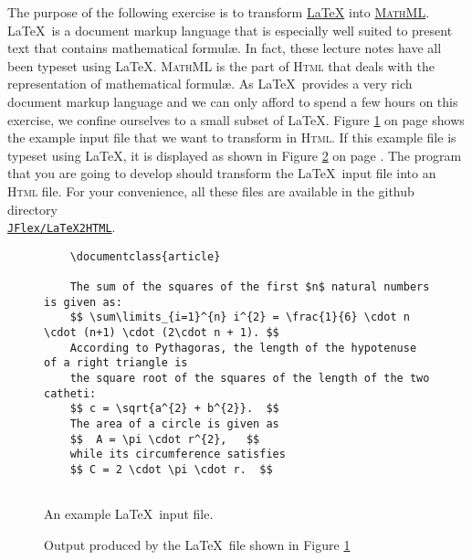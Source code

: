 \exerciseEng
The purpose of the following exercise is to transform \href{http://www.latex-project.org}{\LaTeX} into 
\href{https://www.tutorialspoint.com/mathml/index.htm}{\textsc{MathML}}.  \LaTeX\ is a document markup language
that is especially well suited to present text that contains mathematical formul\ae.  In fact, these
lecture notes have all been typeset using \LaTeX.  \textsc{MathML} is the part of \textsc{Html} that
deals with the representation of mathematical formul\ae.  As \LaTeX\ provides a very rich
document markup language and we can only afford to spend a few hours on this exercise, we confine
ourselves to a small subset of \LaTeX.  Figure \ref{fig:input.tex} on page \pageref{fig:input.tex}
shows the example input file that we want to transform in \textsc{Html}.  If this example file is
typeset using \LaTeX, it is displayed as shown in Figure \ref{fig:input.pdf} on page
\pageref{fig:input.pdf}.  The program that you are
going to develop should transform the \LaTeX\ input file into an \textsc{Html} file.  For your
convenience, all these files are available in the github directory 
\\[0.2cm]
\hspace*{1.3cm}
\href{https://github.com/karlstroetmann/Formal-Languages/tree/master/JFlex/LaTeX2HTML}{\texttt{JFlex/LaTeX2HTML}}.

\begin{figure}[!ht]
  \centering
\begin{verbatim}
    \documentclass{article}
    
    The sum of the squares of the first $n$ natural numbers is given as:
    $$ \sum\limits_{i=1}^{n} i^{2} = \frac{1}{6} \cdot n \cdot (n+1) \cdot (2\cdot n + 1). $$
    According to Pythagoras, the length of the hypotenuse of a right triangle is
    the square root of the squares of the length of the two catheti:
    $$ c = \sqrt{a^{2} + b^{2}}.  $$
    The area of a circle is given as 
    $$  A = \pi \cdot r^{2},   $$ 
    while its circumference satisfies
    $$ C = 2 \cdot \pi \cdot r.  $$
    
    \end{verbatim}
  \caption{An example \LaTeX\ input file.}
  \label{fig:input.tex}
\end{figure}

\begin{figure}[!ht]
  \centering
  \caption{Output produced by the \LaTeX\ file shown in Figure \ref{fig:input.tex}}
  \label{fig:input.pdf}
\end{figure}

